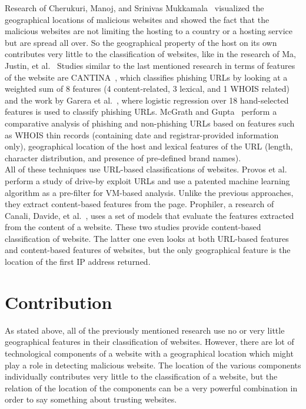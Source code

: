 \documentclass[twoside,openright,notitlepage]{uva-bachelor-thesis}
\begin{document}
Research of Cherukuri, Manoj, and Srinivas Mukkamala~\cite{cherukuri2011link} visualized the geographical locations of malicious websites and showed the fact that the malicious websites are not limiting the hosting to a country or a hosting service but are spread all over. So the geographical property of the host on its own contributes very little to the classification of websites, like in the research of Ma, Justin, et al.~\cite{ma2009beyond} Studies similar to the last mentioned research in terms of features of the website are CANTINA~\cite{zhang2007cantina}, which classifies phishing URLs by looking at a weighted sum of 8 features (4 content-related, 3 lexical, and 1 WHOIS related) and the work by Garera et al.~\cite{garera2007framework}, where logistic regression over 18 hand-selected features is used to classify phishing URLs. McGrath and Gupta~\cite{mcgrath2008behind} perform a comparative analysis of phishing and non-phishing URLs based on features such as WHOIS thin records (containing date and registrar-provided information only), geographical location of the host and lexical features of the URL (length, character distribution, and presence of pre-defined brand names). \\

All of these techniques use URL-based classifications of websites. Provos et al.~\cite{mavrommatis2008all} perform a study of drive-by exploit URLs and use a patented machine learning algorithm as a pre-filter for VM-based analysis. Unlike the previous approaches, they extract content-based features from the page. Prophiler, a research of Canali, Davide, et al.~\cite{canali2011prophiler}, uses a set of models that evaluate the features extracted from the content of a website. These two studies provide content-based classification of website. The latter one even looks at both URL-based features and content-based features of websites, but the only geographical feature is the location of the first IP address returned.

\section{Contribution}
As stated above, all of the previously mentioned research use no or very little geographical features in their classification of websites. However, there are lot of technological components of a website with a geographical location which might play a role in detecting malicious website. The location of the various components individually contributes very little to the classification of a website, but the relation of the location of the components can be a very powerful combination in order to say something about trusting websites.\\
\end{document}
